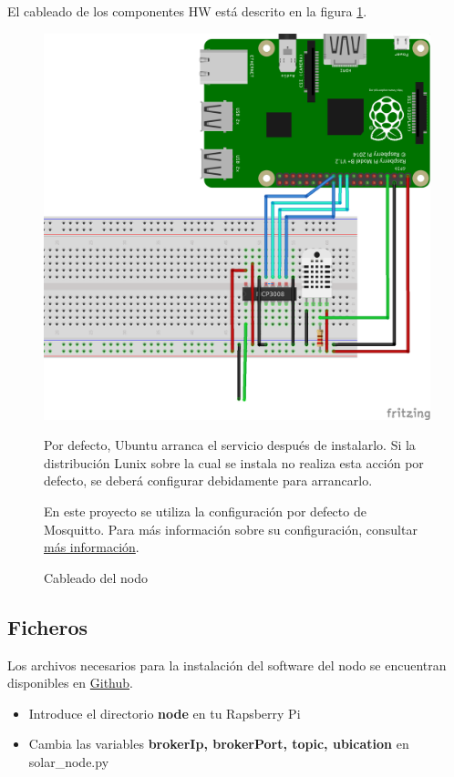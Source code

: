 El cableado de los componentes HW está descrito en la figura \ref{wiring}.
\begin{figure}[htb]
	\begin{center}
		\includegraphics[width=12cm]{figures/solar_project_node_diagram.png}
		\caption{Cableado del nodo}
	\end{center}

Por defecto, Ubuntu arranca el servicio después de instalarlo. Si la distribución Lunix sobre la cual se instala no realiza esta acción por defecto, se deberá configurar debidamente para arrancarlo.

En este proyecto se utiliza la configuración por defecto de Mosquitto. Para más información sobre su configuración, consultar \href{https://www.digitalocean.com/community/tutorials/how-to-install-and-secure-the-mosquitto-mqtt-messaging-broker-on-ubuntu-16-04}{más información}.

	\label{wiring}
\end{figure}

\subsection{Ficheros}
\label{makereference7.1.3}
Los archivos necesarios para la instalación del software del nodo se encuentran disponibles en \href{https://github.com/MrSlide22/TFG/node}{Github}.

\begin{itemize}
	\item Introduce el directorio \textbf{node} en tu Rapsberry Pi
	\item Cambia las variables \textbf{brokerIp, brokerPort, topic, ubication} en solar\_node.py
\end{itemize}

